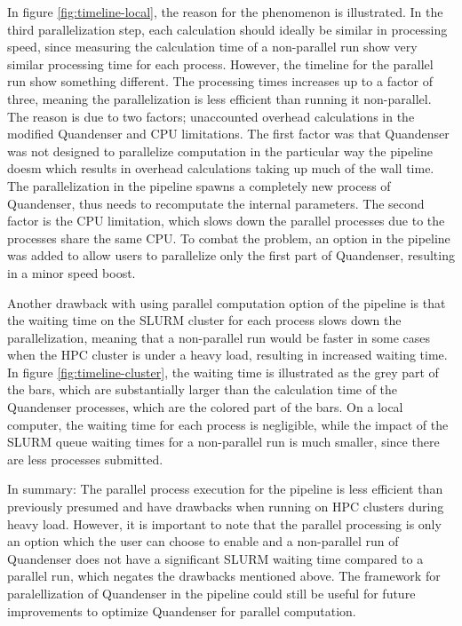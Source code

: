 In figure \ref{fig:timeline-local}, the reason for the phenomenon is illustrated. In the third parallelization step, each calculation should ideally be similar in processing speed, since measuring the calculation time of a non-parallel run show very similar processing time for each process. However, the timeline for the parallel run show something different. The processing times increases up to a factor of three, meaning the parallelization is less efficient than running it non-parallel. The reason is due to two factors; unaccounted overhead calculations in the modified Quandenser and CPU limitations. The first factor was that Quandenser was not designed to parallelize computation in the particular way the pipeline doesm which results in overhead calculations taking up much of the wall time. The parallelization in the pipeline spawns a completely new process of Quandenser, thus needs to recomputate the internal parameters. The second factor is the CPU limitation, which slows down the parallel processes due to the processes share the same CPU. To combat the problem, an option in the pipeline was added to allow users to parallelize only the first part of Quandenser, resulting in a minor speed boost.

Another drawback with using parallel computation option of the pipeline is that the waiting time on the SLURM cluster for each process slows down the parallelization, meaning that a non-parallel run would be faster in some cases when the HPC cluster is under a heavy load, resulting in increased waiting time. In figure \ref{fig:timeline-cluster}, the waiting time is illustrated as the grey part of the bars, which are substantially larger than the calculation time of the Quandenser processes, which are the colored part of the bars. On a local computer, the waiting time for each process is negligible, while the impact of the SLURM queue waiting times for a non-parallel run is much smaller, since there are less processes submitted.

In summary: The parallel process execution for the pipeline is less efficient than previously presumed and have drawbacks when running on HPC clusters during heavy load. However, it is important to note that the parallel processing is only an option which the user can choose to enable and a non-parallel run of Quandenser does not have a significant SLURM waiting time compared to a parallel run, which negates the drawbacks mentioned above. The framework for paralellization of Quandenser in the pipeline could still be useful for future improvements to optimize Quandenser for parallel computation.


